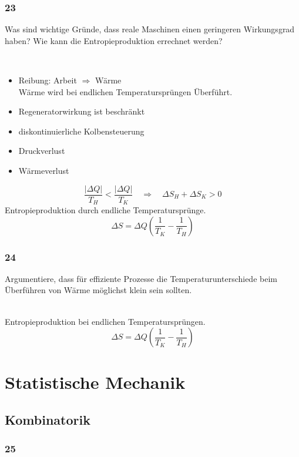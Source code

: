 \subsection{23}
\begin{myfrag}
Was sind wichtige Gründe, dass reale Maschinen einen geringeren Wirkungsgrad
haben? Wie kann die Entropieproduktion errechnet werden?
\end{myfrag}
\quad \\
\begin{itemize}


\item Reibung: Arbeit $\Rightarrow$ Wärme \\
Wärme wird bei endlichen Temperatursprüngen Überführt.
\item Regeneratorwirkung ist beschränkt
\item diskontinuierliche Kolbensteuerung
\item Druckverlust
\item Wärmeverlust
\end{itemize}
$$\dfrac{|\Delta Q|}{T_H} < \dfrac{| \Delta Q|}{T_K} \quad \Rightarrow \quad \Delta S_H + \Delta S_K > 0 $$ 
Entropieproduktion durch endliche Temperatursprünge. 
$$ \Delta S = \Delta Q \left( \dfrac{1}{T_K} - \dfrac{1}{T_H}\right) $$
\subsection{24}
\begin{myfrag}
Argumentiere, dass für effiziente Prozesse die Temperaturunterschiede beim
Überführen von Wärme möglichst klein sein sollten.
\end{myfrag}
\quad \\
Entropieproduktion bei endlichen Temperatursprüngen. \\ $$ \Delta S = \Delta Q \left( \dfrac{1}{T_K} - \dfrac{1}{T_H}\right) $$

\chapter{Statistische Mechanik}
\section{Kombinatorik}
\subsection{25}
\begin{myfrag}
\end{myfrag}
